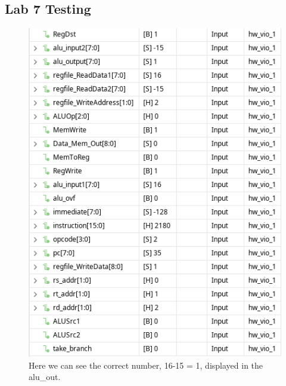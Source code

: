\documentclass[12pt,a4paper]{article}
\begin{document}
\subsection*{Lab 7 Testing}

\begin{figure}
\includegraphics{image2}
\caption{Here we can see the correct number, 16-15 = 1, displayed in the alu\_out.}
\end{figure}
\end{document}
